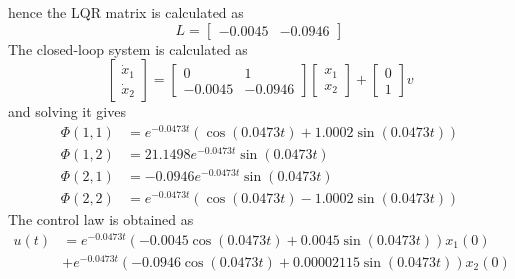 hence the LQR matrix is calculated as
\begin{equation}
    L=\begin{bmatrix}
        -0.0045&   -0.0946
    \end{bmatrix}
\end{equation}
The closed-loop system is calculated as
\begin{equation}
    \begin{bmatrix}
        \dot{x}_1\\\dot{x}_2
    \end{bmatrix}=\begin{bmatrix}
        0& 1\\ -0.0045&   -0.0946
    \end{bmatrix}\begin{bmatrix}
        x_1\\x_2
    \end{bmatrix}+\begin{bmatrix}
        0\\1
    \end{bmatrix}v
\end{equation}
and solving it gives
\begin{equation}
\begin{split}
    \Phi(1,1)&=e^{-0.0473t}(\cos(0.0473t)+1.0002\sin(0.0473t))\\
    \Phi(1,2)&=21.1498e^{-0.0473t}\sin(0.0473t)\\
    \Phi(2,1)&=-0.0946e^{-0.0473t}\sin(0.0473t)\\
    \Phi(2,2)&=e^{-0.0473t}(\cos(0.0473t)-1.0002\sin(0.0473t))
\end{split}
\end{equation}
The control law is obtained as
\begin{equation}
\begin{split}
    u(t)&=e^{-0.0473t}(-0.0045\cos(0.0473t)+0.0045\sin(0.0473t))x_1(0)\\
    &+e^{-0.0473t}(-0.0946\cos(0.0473t)+0.00002115\sin(0.0473t))x_2(0)
\end{split}
\end{equation}


